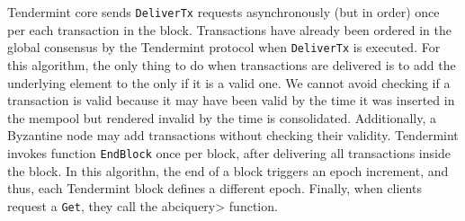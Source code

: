 Tendermint core sends \texttt{DeliverTx} requests
asynchronously (but in order) once per each transaction in the block.
%
Transactions have already been ordered in the global consensus by
the Tendermint protocol when \texttt{DeliverTx} is executed.
%
For this algorithm, the only thing to do when transactions are delivered is to add
the underlying element to the \setchain only if it is a valid one.
We cannot avoid checking if a transaction is valid because it may have been
valid by the time it was inserted in the mempool but rendered invalid by the
time is consolidated.
%
Additionally, a Byzantine node may add transactions without checking their
validity.
%
Tendermint invokes function \texttt{EndBlock} once per block, after delivering
all transactions inside the block.
%
In this algorithn, the end of a block triggers an epoch increment, and thus,
each Tendermint block defines a different \setchain epoch.
%
Finally, when clients request a \texttt{Get}, they call the \<abciquery>
function.

